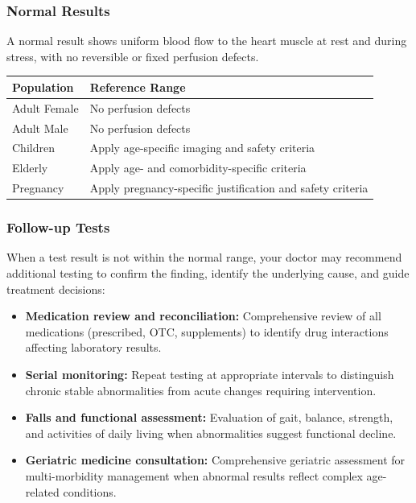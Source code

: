 \subsubsection*{Normal Results}
A normal result shows uniform blood flow to the heart muscle at rest and during stress, with no reversible or fixed perfusion defects.

\begin{center}
\begin{tabular}{ll}
\toprule
\textbf{Population} & \textbf{Reference Range} \\
\midrule
Adult Female & No perfusion defects \\
Adult Male & No perfusion defects \\
Children & Apply age-specific imaging and safety criteria \\
Elderly & Apply age- and comorbidity-specific criteria \\
Pregnancy & Apply pregnancy-specific justification and safety criteria \\
\bottomrule
\end{tabular}
\end{center}
\subsubsection*{Follow-up Tests}
When a test result is not within the normal range, your doctor may recommend additional testing to confirm the finding, identify the underlying cause, and guide treatment decisions:
\begin{itemize}
    \item \textbf{Medication review and reconciliation:} Comprehensive review of all medications (prescribed, OTC, supplements) to identify drug interactions affecting laboratory results.
    \item \textbf{Serial monitoring:} Repeat testing at appropriate intervals to distinguish chronic stable abnormalities from acute changes requiring intervention.
    \item \textbf{Falls and functional assessment:} Evaluation of gait, balance, strength, and activities of daily living when abnormalities suggest functional decline.
    \item \textbf{Geriatric medicine consultation:} Comprehensive geriatric assessment for multi-morbidity management when abnormal results reflect complex age-related conditions.
\end{itemize}
\clearpage
